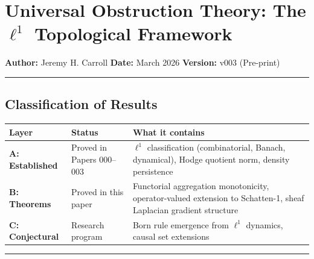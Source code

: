 \documentclass[
]{article}
\author{}
\date{}
\begin{document}
\section{\texorpdfstring{Universal Obstruction Theory: The \(\ell^1\)
Topological
Framework}{Universal Obstruction Theory: The \textbackslash ell\^{}1 Topological Framework}}\label{universal-obstruction-theory-the-ell1-topological-framework}

\textbf{Author:} Jeremy H. Carroll \textbf{Date:} March 2026
\textbf{Version:} v003 (Pre-print)

\begin{center}\rule{0.5\linewidth}{0.5pt}\end{center}

\subsection{Classification of Results}\label{classification-of-results}

\begin{longtable}[]{@{}
  >{\raggedright\arraybackslash}p{}
  >{\raggedright\arraybackslash}p{}
  >{\raggedright\arraybackslash}p{}@{}}
\toprule\noalign{}
\begin{minipage}[b]{\linewidth}\raggedright
Layer
\end{minipage} & \begin{minipage}[b]{\linewidth}\raggedright
Status
\end{minipage} & \begin{minipage}[b]{\linewidth}\raggedright
What it contains
\end{minipage} \\
\midrule\noalign{}
\endhead
\bottomrule\noalign{}
\endlastfoot
\textbf{A: Established} & Proved in Papers 000--003 & \(\ell^1\)
classification (combinatorial, Banach, dynamical), Hodge quotient norm,
density persistence \\
\textbf{B: Theorems} & Proved in this paper & Functorial aggregation
monotonicity, operator-valued extension to Schatten-1, sheaf Laplacian
gradient structure \\
\textbf{C: Conjectural} & Research program & Born rule emergence from
\(\ell^1\) dynamics, causal set extensions \\
\end{longtable}

\begin{center}\rule{0.5\linewidth}{0.5pt}\end{center}
\end{document}
